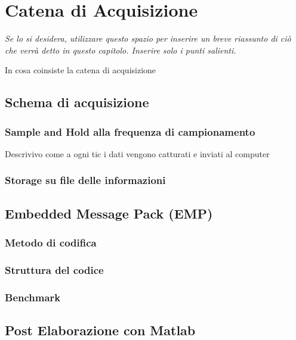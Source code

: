 \chapter{Catena di Acquisizione}\label{Catena di Acquisizione}

\begin{minipage}{12cm}\textit{Se lo si desidera, utilizzare questo spazio per inserire un breve riassunto di ci\`o che verr\`a detto in questo capitolo. Inserire solo i punti salienti.}
\end{minipage}

\vspace*{1cm}

In cosa coinsiste la catena di acquisizione

\section{Schema di acquisizione}

\subsection{Sample and Hold alla frequenza di campionamento}
Descrivivo come a ogni tic i dati vengono catturati e inviati al computer
\subsection{Storage su file delle informazioni}

\section{Embedded Message Pack (EMP)}\label{EMP}
\label{sec:iniziare}
\subsection{Metodo di codifica}
\subsection{Struttura del codice}
\subsection{Benchmark}


\section{Post Elaborazione con Matlab}
